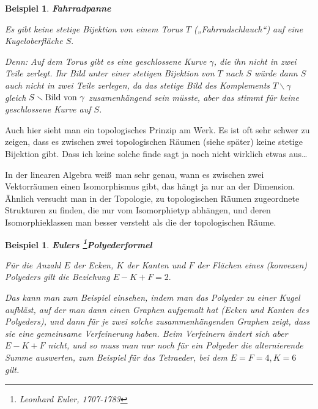 \documentclass[12pt]{scrbook}   %
\newtheorem{bsp}[alles]{Beispiel}
\begin{document}
\begin{bsp}{\bf Fahrradpanne}

{\rm Es gibt keine stetige Bijektion von einem Torus $T$ 
(„Fahrradschlauch“) auf eine Kugeloberfläche $S.$ 


Denn:  Auf dem Torus gibt es eine geschlossene Kurve $\gamma$, die ihn nicht 
in zwei 
Teile zerlegt. Ihr Bild unter einer stetigen Bijektion von $T$ nach $S$ 
würde dann $S$ auch nicht in zwei Teile zerlegen, da das stetige Bild des
Komplements $T\smallsetminus \gamma$ gleich 
$S\smallsetminus{\rm Bild\ von\ }\gamma$ zusamenhängend sein müsste, aber
das stimmt für keine geschlossene Kurve auf $S$.}
\end{bsp}

Auch hier sieht man ein topologisches Prinzip am Werk. Es ist oft sehr schwer
zu zeigen, dass es zwischen zwei topologischen Räumen (siehe später) keine
stetige Bijektion gibt. Dass ich keine solche finde sagt ja noch nicht wirklich
etwas aus\dots

In der linearen Algebra wei\ss\  man sehr genau, wann es 
zwischen zwei Vektorräumen einen Isomorphismus gibt, das hängt ja nur an 
der Dimension. \"Ahnlich versucht man in der Topologie, zu topologischen 
Räumen zugeordnete Strukturen zu finden, die nur vom Isomorphietyp 
abhängen, und deren Isomorphieklassen man besser versteht als die der 
topologischen Räume.

\begin{bsp} {\bf Eulers \footnote{Leonhard Euler, 1707-1783}Polyederformel}

{\rm Für die Anzahl $E$ der Ecken, $K$ der Kanten und $F$ der Flächen eines
(konvexen) Polyeders gilt die Beziehung $E-K+F=2.$

Das kann man zum Beispiel einsehen, indem man das Polyeder zu einer Kugel 
aufbläst, auf der man dann einen Graphen aufgemalt hat (Ecken und Kanten des 
Polyeders), und dann für je zwei solche zusammenhängenden Graphen zeigt, 
dass sie eine gemeinsame Verfeinerung haben. Beim Verfeinern ändert sich
aber $E-K+F$ nicht, und so muss man nur noch für ein Polyeder die 
alternierende Summe auswerten, zum Beispiel für das Tetraeder, bei dem 
$E=F=4, K=6$ gilt.
}
\end{bsp}
\end{document}
